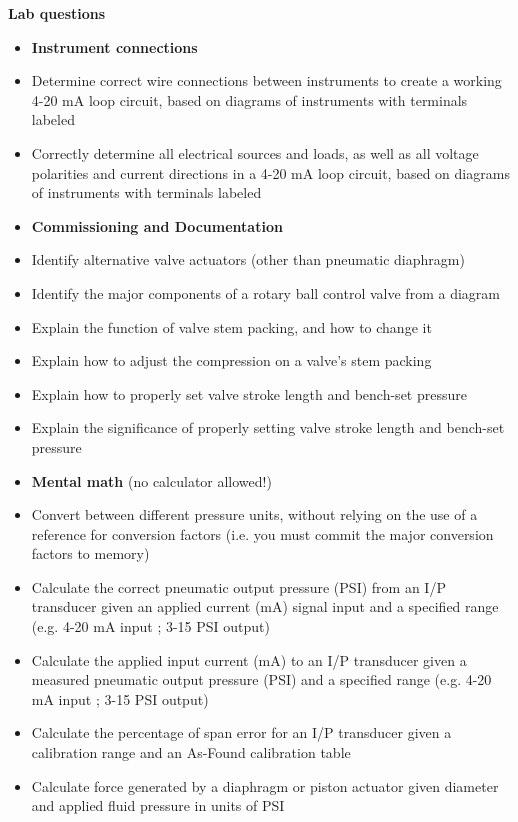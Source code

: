 \begin{itemize}
\vskip 10pt

\vfil \eject

\noindent
{\bf Lab questions}

\begin{itemize}
\item{} {\bf Instrument connections}
\item{} Determine correct wire connections between instruments to create a working 4-20 mA loop circuit, based on diagrams of instruments with terminals labeled
\item{} Correctly determine all electrical sources and loads, as well as all voltage polarities and current directions in a 4-20 mA loop circuit, based on diagrams of instruments with terminals labeled
\end{itemize}

\filbreak

\begin{itemize}
\item{} {\bf Commissioning and Documentation}
\item{} Identify alternative valve actuators (other than pneumatic diaphragm)
\item{} Identify the major components of a rotary ball control valve from a diagram
\item{} Explain the function of valve stem packing, and how to change it
\item{} Explain how to adjust the compression on a valve's stem packing
\item{} Explain how to properly set valve stroke length and bench-set pressure
\item{} Explain the significance of properly setting valve stroke length and bench-set pressure
\end{itemize}

\filbreak

\begin{itemize}
\item{} {\bf Mental math} (no calculator allowed!)
\item{} Convert between different pressure units, without relying on the use of a reference for conversion factors (i.e. you must commit the major conversion factors to memory)
\item{} Calculate the correct pneumatic output pressure (PSI) from an I/P transducer given an applied current (mA) signal input and a specified range (e.g. 4-20 mA input ; 3-15 PSI output)
\item{} Calculate the applied input current (mA) to an I/P transducer given a measured pneumatic output pressure (PSI) and a specified range (e.g. 4-20 mA input ; 3-15 PSI output) 
\item{} Calculate the percentage of span error for an I/P transducer given a calibration range and an As-Found calibration table 
\item{} Calculate force generated by a diaphragm or piston actuator given diameter and applied fluid pressure in units of PSI
\end{itemize}


\end{itemize}
